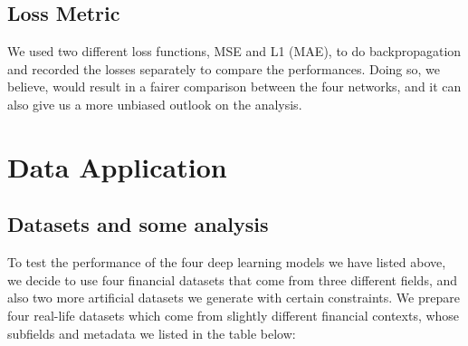 \documentclass[letterpaper, 10 pt, conference]{ieeeconf}  %
\begin{document}
    \subsection{Loss Metric}
        We used two different loss functions, MSE and L1 (MAE), to do backpropagation and recorded the losses separately to compare the performances. Doing so, we believe, would result in a fairer comparison between the four networks, and it can also give us a more unbiased outlook on the analysis.

\section{Data Application}
    \subsection{Datasets and some analysis}
    To test the performance of the four deep learning models we have listed above, we decide to use four financial datasets that come from three different fields, and also two more artificial datasets we generate with certain constraints. We prepare four real-life datasets which come from slightly different financial contexts, whose subfields and metadata we listed in the table below:

        \begin{table}[h!] \centering
            \caption{Datasets}
            \begin{threeparttable}
            \end{threeparttable}
        \end{table}
\end{document}
